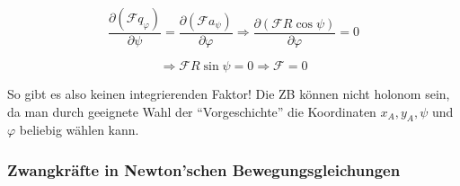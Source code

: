 \documentclass[10pt, letterpaper]{article}
\begin{document}
\[\frac{\partial(\mathcal{F}q_\varphi)}{\partial \psi} = \frac{\partial(\mathcal{F}a_\psi)}{\partial \varphi} \Rightarrow \frac{\partial(\mathcal{F}R\cos\psi)}{\partial \varphi} = 0\]

\[\Rightarrow \mathcal{F}R\sin\psi = 0 \Rightarrow \mathcal{F} = 0\]

So gibt es also keinen integrierenden Faktor! Die ZB können nicht holonom sein, da man durch geeignete Wahl der ``Vorgeschichte'' die Koordinaten $x_A, y_A, \psi$ und $\varphi$ beliebig wählen kann.









\subsubsection{Zwangkräfte in Newton'schen Bewegungsgleichungen}
\end{document}
